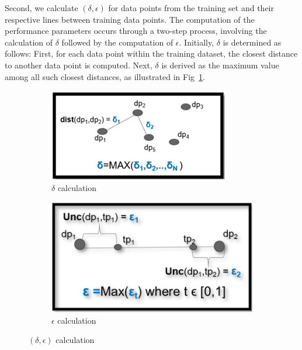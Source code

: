 Second, we calculate $(\delta,\epsilon)$ for data points from the training set and their respective lines between training data points. The computation of the performance parameters occurs through a two-step process, involving the calculation of $\delta$ followed by the computation of $\epsilon$. Initially, $\delta$ is determined as follows: First, for each data point within the training dataset, the closest distance to another data point is computed. Next, $\delta$ is derived as the maximum value among all such closest distances, as illustrated in Fig~\ref{fig:delta}.
\begin{figure}
\centering
\begin{subfigure}{.24\textwidth}
    \centering
    \includegraphics[width=1\linewidth]{Fig/OOD_delta.png}  
    \caption{$\delta$ calculation}
    \label{fig:delta}
\end{subfigure}
\begin{subfigure}{.24\textwidth}
    \centering
    \includegraphics[width=0.93\linewidth]{Fig/OOD_epsilon.png}  
    \caption{$\epsilon$ calculation}
    \label{fig:epsilon}
 \end{subfigure}
\caption{$(\delta,\epsilon)$ calculation}
\label{FIGURE LABEL}
\end{figure}
